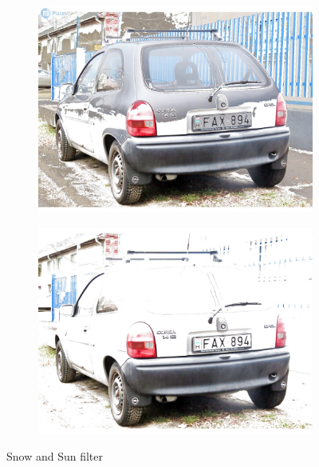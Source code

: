 \begin{figure}[!htb]
    \begin{subfigure}[b]{.45\textwidth}
        \includegraphics[width=\textwidth]{figures/snow.jpg}
    \end{subfigure}
    \hfill
    \begin{subfigure}[b]{.45\textwidth}
        \includegraphics[width=\textwidth]{figures/sunny.jpg}
    \end{subfigure}
    \hfill
    \caption{Snow and Sun filter}
    \label{fig:wheater-snow-sun}
\end{figure}

